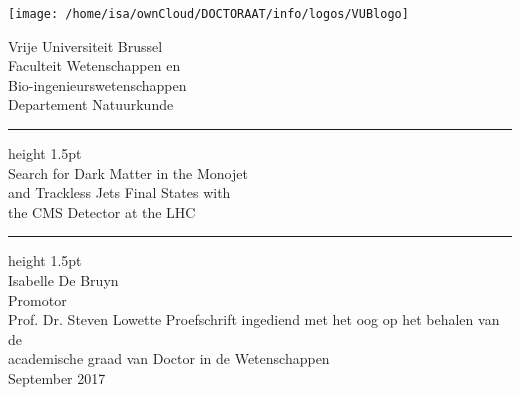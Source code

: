 \documentclass[10pt,a4paper,twoside,dutch,english]{book}
\def\hrulefill{\leavevmode\leaders\hrule height 1.5pt\hfill\kern 0pt \\}
\begin{document}
\graphicspath{{fig/}}

% 
 \thispagestyle{empty}   %
% 
 \noindent
 \begin{minipage}{3cm}%
   \texttt{[image: /home/isa/ownCloud/DOCTORAAT/info/logos/VUBlogo]}
 \end{minipage}\hfill
 \begin{minipage}{8cm}
 \raggedleft
 \textsf{Vrije Universiteit Brussel\\ \vspace{.15cm}
 Faculteit Wetenschappen en\\
 Bio-ingenieurswetenschappen\\  \vspace{.15cm}
 Departement Natuurkunde}
 \end{minipage}
% 
\begin{center}
\vspace{5cm}
\bigskip
 \hrulefill \vspace{.2cm}
 \onehalfspacing
     \LARGE \noindent \textsf{Search for Dark Matter in the Monojet\\ and Trackless Jets Final States with \\the CMS Detector at the LHC}\\ 
 \hrulefill 
\vspace{1cm}
 \bigskip
   \Large\noindent \textsf{Isabelle De Bruyn} \\
 \bigskip
 \large
\vspace{2.5cm}
\textsf{Promotor\\ \vspace{.1cm}
Prof. Dr. Steven Lowette}
 \normalsize
 \vfill
 \textsf{Proefschrift ingediend met het oog op het behalen van de\\ academische graad van Doctor in de Wetenschappen\\ \vspace{.3cm}
 September 2017}\
 
 \end{center}

\clearpage{\pagestyle{empty}\cleardoublepage}


\frontmatter
\end{document}
